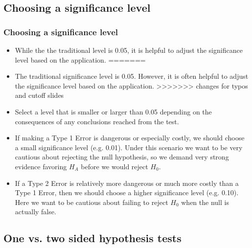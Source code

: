 
\subsection{Choosing a significance level}


\begin{frame}
\frametitle{Choosing a significance level}
\vspace{-1em}
\begin{itemize}

<<<<<<< HEAD
\item While the the traditional level is 0.05, it is helpful to adjust the significance level based on the application. 
=======
\item The traditional significance level is 0.05. However, it is often helpful to adjust the significance level based on the application. 
>>>>>>> changes for typos and cutoff slides

\item Select a level that is smaller or larger than 0.05 depending on the consequences of any conclusions reached from the test.

\item If making a Type 1 Error is dangerous or especially costly, we should choose a small significance level (e.g. 0.01). Under this scenario we want to be very cautious about rejecting the null hypothesis, so we demand very strong evidence favoring $H_A$ before we would reject $H_0$.

\item If a Type 2 Error is relatively more dangerous or much more costly than a Type 1 Error, then we should choose a higher significance level (e.g. 0.10). Here we want to be cautious about failing to reject $H_0$ when the null is actually false.

\end{itemize}

\end{frame}

 
\subsection{One vs. two sided hypothesis tests}
 
 
